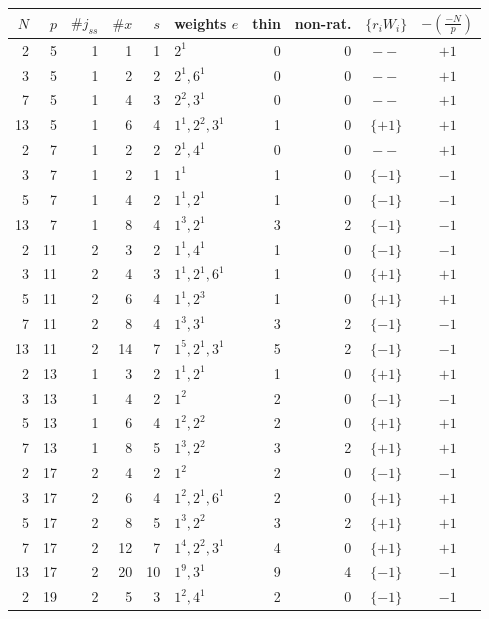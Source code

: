 \begin{longtable}{rrrrrlrrcc}
\toprule
$N$ & $p$ & $\#j_{ss}$ & $\#x$ & $s$ & weights $e$ & thin & non-rat. & $\{r_iW_i\}$ & $-\left(\frac{-N}{p}\right)$\\
\midrule
\endhead
2 & 5 & 1 & 1 & 1 & $2^{1}$ & 0 & 0 & $--$ & $+1$\\
3 & 5 & 1 & 2 & 2 & $2^{1}, 6^{1}$ & 0 & 0 & $--$ & $+1$\\
7 & 5 & 1 & 4 & 3 & $2^{2}, 3^{1}$ & 0 & 0 & $--$ & $+1$\\
13 & 5 & 1 & 6 & 4 & $1^{1}, 2^{2}, 3^{1}$ & 1 & 0 & $\{+1\}$ & $+1$\\
2 & 7 & 1 & 2 & 2 & $2^{1}, 4^{1}$ & 0 & 0 & $--$ & $+1$\\
3 & 7 & 1 & 2 & 1 & $1^{1}$ & 1 & 0 & $\{-1\}$ & $-1$\\
5 & 7 & 1 & 4 & 2 & $1^{1}, 2^{1}$ & 1 & 0 & $\{-1\}$ & $-1$\\
13 & 7 & 1 & 8 & 4 & $1^{3}, 2^{1}$ & 3 & 2 & $\{-1\}$ & $-1$\\
2 & 11 & 2 & 3 & 2 & $1^{1}, 4^{1}$ & 1 & 0 & $\{-1\}$ & $-1$\\
3 & 11 & 2 & 4 & 3 & $1^{1}, 2^{1}, 6^{1}$ & 1 & 0 & $\{+1\}$ & $+1$\\
5 & 11 & 2 & 6 & 4 & $1^{1}, 2^{3}$ & 1 & 0 & $\{+1\}$ & $+1$\\
7 & 11 & 2 & 8 & 4 & $1^{3}, 3^{1}$ & 3 & 2 & $\{-1\}$ & $-1$\\
13 & 11 & 2 & 14 & 7 & $1^{5}, 2^{1}, 3^{1}$ & 5 & 2 & $\{-1\}$ & $-1$\\
2 & 13 & 1 & 3 & 2 & $1^{1}, 2^{1}$ & 1 & 0 & $\{+1\}$ & $+1$\\
3 & 13 & 1 & 4 & 2 & $1^{2}$ & 2 & 0 & $\{-1\}$ & $-1$\\
5 & 13 & 1 & 6 & 4 & $1^{2}, 2^{2}$ & 2 & 0 & $\{+1\}$ & $+1$\\
7 & 13 & 1 & 8 & 5 & $1^{3}, 2^{2}$ & 3 & 2 & $\{+1\}$ & $+1$\\
2 & 17 & 2 & 4 & 2 & $1^{2}$ & 2 & 0 & $\{-1\}$ & $-1$\\
3 & 17 & 2 & 6 & 4 & $1^{2}, 2^{1}, 6^{1}$ & 2 & 0 & $\{+1\}$ & $+1$\\
5 & 17 & 2 & 8 & 5 & $1^{3}, 2^{2}$ & 3 & 2 & $\{+1\}$ & $+1$\\
7 & 17 & 2 & 12 & 7 & $1^{4}, 2^{2}, 3^{1}$ & 4 & 0 & $\{+1\}$ & $+1$\\
13 & 17 & 2 & 20 & 10 & $1^{9}, 3^{1}$ & 9 & 4 & $\{-1\}$ & $-1$\\
2 & 19 & 2 & 5 & 3 & $1^{2}, 4^{1}$ & 2 & 0 & $\{-1\}$ & $-1$\\

\end{longtable}
